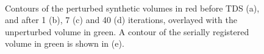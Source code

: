   \begin{figure}[!t]
    \centering
    \\
    \caption{Contours of the perturbed synthetic volumes in red before TDS (a), and after 1 (b), 7 (c) and 40 (d) iterations, overlayed with the unperturbed volume in green. A contour of the serially registered volume in green is shown in (e).}
    \label{fig:synthetic_contours}
  \end{figure}
